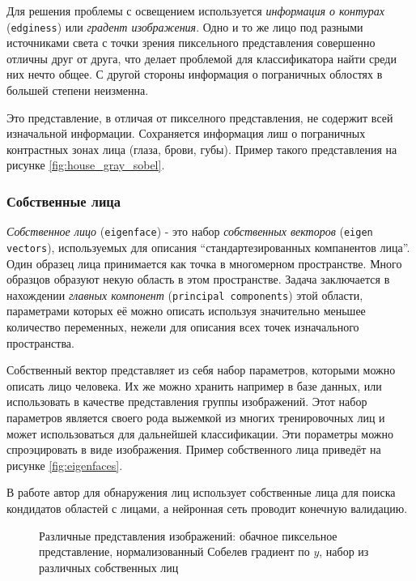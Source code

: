 \documentclass[12pt]{report}
\begin{document}
Для решения проблемы с освещением используется \emph{информация о контурах} (\texttt{edginess}) или \emph{градент изображения}. Одно и то же лицо под разными источниками света с точки зрения пиксельного представления совершенно отличны друг от друга, что делает проблемой для классификатора найти среди них нечто общее. С другой стороны информация о пограничных облостях в большей степени неизменна. \citep{ahmadyfard2008hierarchical}

Это представление, в отличая от пикселного представления, не содержит всей изначальной информации. Сохраняется информация лиш о пограничных контрастных зонах лица (глаза, брови, губы). Пример такого представления на рисунке \ref{fig:house_gray_sobel}.

\subsubsection{Собственные лица}
\emph{Собственное лицо} (\texttt{eigenface}) - это набор \emph{собственных векторов} (\texttt{eigen vectors}), используемых для описания ``стандартезированных  компанентов лица''. Один образец лица принимается как точка в многомерном пространстве. Много образцов образуют некую область в этом пространстве. Задача заключается в нахождении \emph{главных компонент} (\texttt{principal components}) этой области, параметрами которых её можно описать используя значительно меньшее количество переменных, нежели для описания всех точек изначального пространства.\citep{turk1991eigenfaces}

Собственный вектор представляет из себя набор параметров, которыми можно описать лицо человека. Их же можно хранить например в базе данных, или использовать в качестве представления группы изображений. Этот набор параметров является своего рода выжемкой из многих тренировочных лиц и может использоваться для дальнейшей классификации. Эти пораметры можно спроэцировать в виде изображения. Пример собственного лица приведёт на рисунке \ref{fig:eigenfaces}.

В работе \citep{tsai2006face} автор для обнаружения лиц использует собственные лица для поиска кондидатов областей с лицами, а нейронная сеть проводит конечную валидацию.

\begin{figure}[h]
	\centering
	\caption{Различные представления изображений:  обачное пиксельное представление,  нормализованный Собелев градиент по $y$,  набор из различных собственных лиц}
	\label{fig:representations}
\end{figure}
\end{document}
